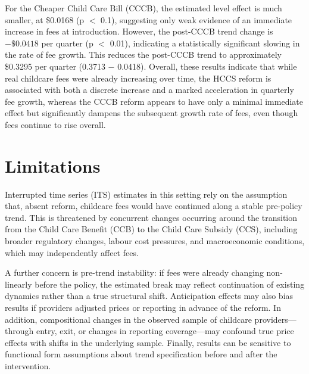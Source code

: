 \documentclass[12pt]{article}
\begin{document}
For the Cheaper Child Care Bill (CCCB), the estimated level effect is much smaller, at \$0.0168 (p $<$ 0.1), suggesting only weak evidence of an immediate increase in fees at introduction. However, the post-CCCB trend change is $- \$0.0418$ per quarter (p $<$ 0.01), indicating a statistically significant slowing in the rate of fee growth. This reduces the post-CCCB trend to approximately \$0.3295 per quarter (0.3713 $-$ 0.0418). Overall, these results indicate that while real childcare fees were already increasing over time, the HCCS reform is associated with both a discrete increase and a marked acceleration in quarterly fee growth, whereas the CCCB reform appears to have only a minimal immediate effect but significantly dampens the subsequent growth rate of fees, even though fees continue to rise overall.

\section{Limitations}
Interrupted time series (ITS) estimates in this setting rely on the assumption that, absent reform, childcare fees would have continued along a stable pre-policy trend. This is threatened by concurrent changes occurring around the transition from the Child Care Benefit (CCB) to the Child Care Subsidy (CCS), including broader regulatory changes, labour cost pressures, and macroeconomic conditions, which may independently affect fees.

A further concern is pre-trend instability: if fees were already changing non-linearly before the policy, the estimated break may reflect continuation of existing dynamics rather than a true structural shift. Anticipation effects may also bias results if providers adjusted prices or reporting in advance of the reform. In addition, compositional changes in the observed sample of childcare providers—through entry, exit, or changes in reporting coverage—may confound true price effects with shifts in the underlying sample. Finally, results can be sensitive to functional form assumptions about trend specification before and after the intervention.
\end{document}
